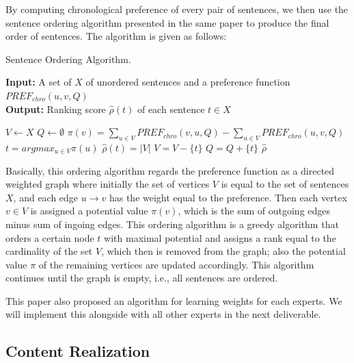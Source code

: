 \documentclass[11pt]{article}
\begin{document}
\indent
By computing chronological preference of every pair of sentences, we then use the sentence ordering algorithm presented in the same paper to produce the final order of sentences. The algorithm is given as follows:

\begin{algorithm}
\caption{Sentence Ordering Algorithm.}\label{euclid}
 \hspace*{\algorithmicindent} \textbf{Input:} A set of $X$ of unordered sentences and a preference function $PREF_{chro}(u,v,Q)$\\
 \hspace*{\algorithmicindent} \textbf{Output:} Ranking score $\hat{\rho}{(t)}$ of each sentence $t\in X$
\begin{algorithmic}[1]
\State $V \gets X$
\State $Q \gets \emptyset$
\State $\pi(v)=\sum_{u\in V}PREF_{chro}(v,u,Q)-\sum_{u\in V}PREF_{chro}(u,v,Q)$
\EndFor
{}
\State $t=argmax_{u\in V}\pi(u)$
\State $\hat{\rho}(t)=|V|$
\State $V=V-\{t\}$
\State $Q=Q+\{t\}$
\EndFor
\EndWhile
\Return $\hat{\rho}$
\EndProcedure
\end{algorithmic}
\end{algorithm}

\indent
Basically, this ordering algorithm regards the preference function as a directed weighted graph where initially the set of vertices $V$ is equal to the set of sentences $X$, and each edge $u\rightarrow v$ has the weight equal to the preference. Then each vertex $v\in V$ is assigned a potential value $\pi(v)$, which is the sum of outgoing edges minus sum of ingoing edges. This ordering algorithm is a greedy algorithm that orders a certain node $t$ with maximal potential and assigns a rank equal to the cardinality of the set $V$, which then is removed from the graph; also the potential value $\pi$ of the remaining vertices are updated accordingly. This algorithm continues until the graph is empty, i.e., all sentences are ordered. 

\indent
This paper also proposed an algorithm for learning weights for each experts. We will implement this alongside with all other experts in the next deliverable.

\subsection{Content Realization}
\end{document}
